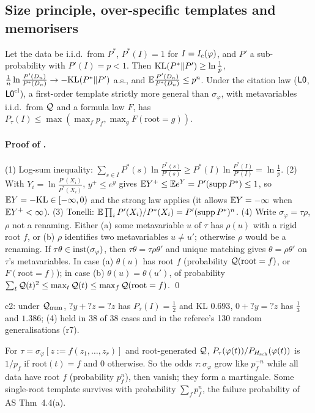 \subsection{Size principle, over-specific templates and memorisers}\label{app:univ:memo}

\begin{theorem}\label{thm:univ:size}
Let the data be i.i.d.\ from $P^*$, $P^*(I)=1$ for $I=I_{\mathrm{c}}(\varphi)$, and $P'$ a sub-probability with $P'(I)=p<1$. Then $\mathrm{KL}(P^*\|P')\ge\ln\frac1p$, $\frac1n\ln\frac{P'(D_n)}{P^*(D_n)}\to-\mathrm{KL}(P^*\|P')$ a.s., and $\mathbb{E}\frac{P'(D_n)}{P^*(D_n)}\le p^n$. Under the citation law ($\mathord{\mathsf{L0}}$, $\mathord{\mathsf{L0}}^{\mathrm{cl}}$), a first-order template strictly more general than $\sigma_\varphi$, with metavariables i.i.d.\ from $\mathcal{Q}$ and a formula law $F$, has $P_\tau(I)\le\max(\max_fp_f,\max_gF(\mathrm{root}=g))$.
\end{theorem}

\paragraph{Proof of .} (1) Log-sum inequality: $\sum_{s\in I}P^*(s)\ln\frac{P^*(s)}{P'(s)}\ge P^*(I)\ln\frac{P^*(I)}{P'(I)}=\ln\frac1p$. (2) With $Y_i=\ln\frac{P'(X_i)}{P^*(X_i)}$, $y^+\le e^y$ gives $\mathbb{E} Y^+\le\mathbb{E} e^Y=P'(\operatorname{supp}P^*)\le1$, so $\mathbb{E} Y=-\mathrm{KL}\in[-\infty,0)$ and the strong law applies (it allows $\mathbb{E} Y=-\infty$ when $\mathbb{E} Y^+<\infty$). (3) Tonelli: $\mathbb{E}\prod_iP'(X_i)/P^*(X_i)=P'(\operatorname{supp}P^*)^n$. (4) Write $\sigma_\varphi=\tau\rho$, $\rho$ not a renaming. Either (a) some metavariable $u$ of $\tau$ has $\rho(u)$ with a rigid root $f$, or (b) $\rho$ identifies two metavariables $u\neq u'$; otherwise $\rho$ would be a renaming. If $\tau\theta\in\mathrm{inst}(\sigma_\varphi)$, then $\tau\theta=\tau\rho\theta'$ and unique matching gives $\theta=\rho\theta'$ on $\tau$'s metavariables. In case (a) $\theta(u)$ has root $f$ (probability $\mathcal{Q}(\mathrm{root}=f)$, or $F(\mathrm{root}=f)$); in case (b) $\theta(u)=\theta(u')$, of probability $\sum_t\mathcal{Q}(t)^2\le\max_t\mathcal{Q}(t)\le\max_f\mathcal{Q}(\mathrm{root}=f)$. \qed

c2: under $\mathcal{Q}_{\mathrm{num}}$, ${?y}+{?z}={?z}$ has $P_\tau(I)=\tfrac12$ and KL $0.693$, $0+{?y}={?z}$ has $\tfrac13$ and $1.386$; (4) held in 38 of 38 cases and in the referee's 130 random generalisations (r7).

\begin{proposition}\label{prop:univ:overspec}
For $\tau=\sigma_\varphi[z:=f(z_1,\dots,z_r)]$ and root-generated $\mathcal{Q}$, $P_\tau(\varphi(t))/P_{H_{\mathrm{sch}}}(\varphi(t))$ is $1/p_f$ if $\mathrm{root}(t)=f$ and $0$ otherwise. So the odds $\tau:\sigma_\varphi$ grow like $p_f^{-n}$ while all data have root $f$ (probability $p_f^n$), then vanish; they form a martingale. Some single-root template survives with probability $\sum_fp_f^n$, the failure probability of AS Thm~4.4(a).
\end{proposition}

